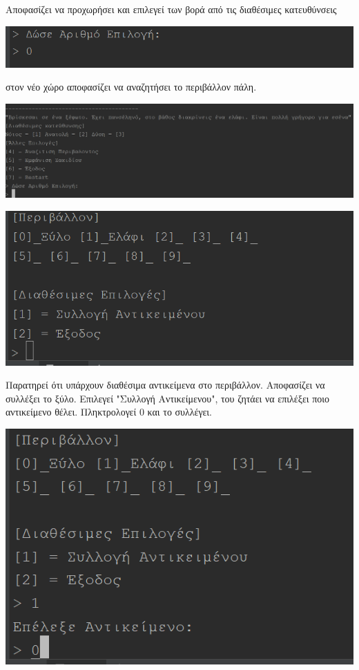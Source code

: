 \noindent
Αποφασίζει να προχωρήσει και επιλεγεί των βορά από τις διαθέσιμες κατευθύνσεις
\begin{center}
			\includegraphics[width=1\textwidth]{image/2.4.PNG}
\end{center}

\noindent
στον νέο χώρο αποφασίζει να αναζητήσει το περιβάλλον πάλη.

\begin{center}
			\includegraphics[width=1\textwidth]{image/2.5.PNG}
\end{center}

\begin{center}
			\includegraphics[width=1\textwidth]{image/2.6.PNG}
\end{center}
\noindent
Παρατηρεί ότι υπάρχουν διαθέσιμα αντικείμενα στο περιβάλλον. Αποφασίζει να 
συλλέξει το ξύλο. Επιλεγεί "Συλλογή Αντικείμενου", του ζητάει να επιλέξει ποιο αντικείμενο θέλει. Πληκτρολογεί 0 και το συλλέγει.

\begin{center}
			\includegraphics[width=1\textwidth]{image/3.1.PNG}
\end{center}

